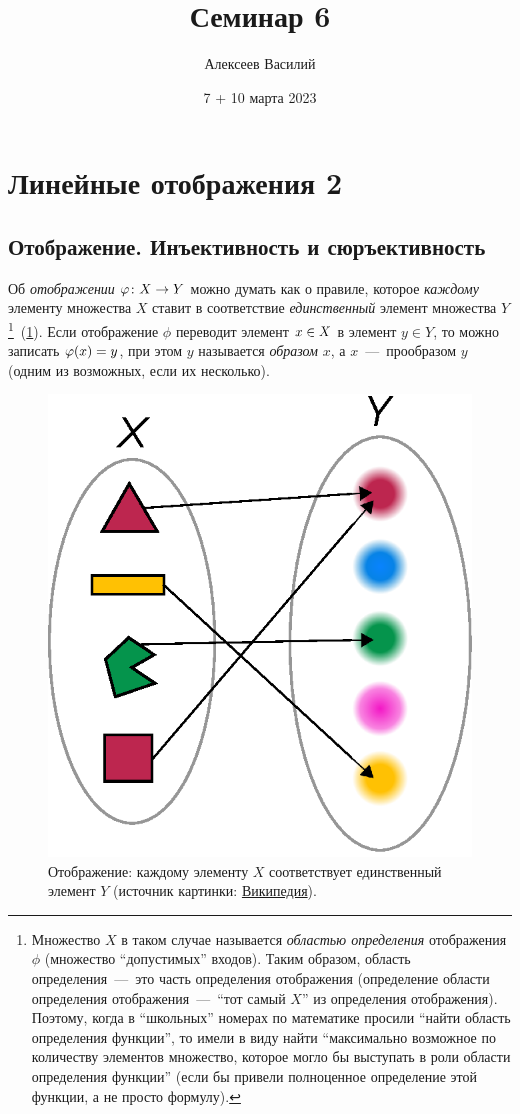 \documentclass[a4paper,12pt]{article}
\author{Алексеев Василий}
\title{Семинар 6}
\date{7 + 10 марта 2023}
\begin{document}
  \maketitle
  
  \tableofcontents

  \thispagestyle{empty}
  
  \newpage
  


  \section{Линейные отображения 2}
  
  \subsection{Отображение. Инъективность и сюръективность}
  
  Об \emph{отображении} $\phi\colon X \hm\to Y$ можно думать как о правиле, которое \emph{каждому} элементу множества $X$ ставит в соответствие \emph{единственный} элемент множества $Y$\footnote{Множество $X$ в таком случае называется \emph{областью определения} отображения $\phi$ (множество ``допустимых'' входов). Таким образом, область определения~---~это часть определения отображения (определение области определения отображения~---~``тот самый $X$'' из определения отображения). Поэтому, когда в ``школьных'' номерах по математике просили ``найти область определения функции'', то имели в виду найти ``максимально возможное по количеству элементов множество, которое могло бы выступать в роли области определения функции'' (если бы привели полноценное определение этой функции, а не просто формулу).}~(\ref{fig:function}).
  Если отображение $\phi$ переводит элемент $x \hm\in X$ в элемент $y \in Y$, то можно записать $\phi(x) \hm= y$, при этом $y$ называется \emph{образом} $x$, а $x$~---~прообразом $y$ (одним из возможных, если их несколько).
  
  \begin{figure}[h]
    \centering
  
    \includegraphics[width=0.3\columnwidth]{function}
  
    \caption{Отображение: каждому элементу $X$ соответствует единственный элемент $Y$ (источник картинки: \href{https://en.wikipedia.org/wiki/Function\_(mathematics)\#/media/File:Function_color_example_3.svg}{Википедия}).}
    \label{fig:function}
  \end{figure}
  
\end{document}
